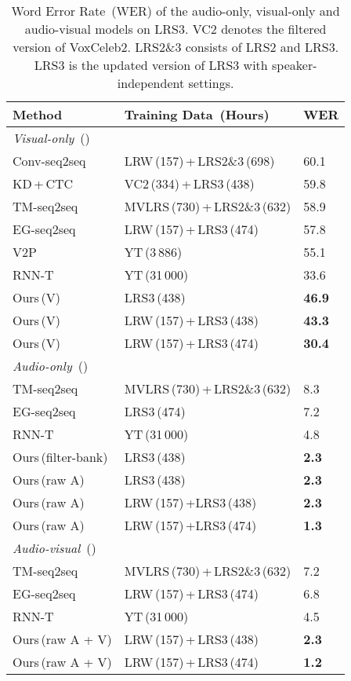 \begin{table}[!t]
\small
\renewcommand\arraystretch{0.9}
\begin{tabularx}{\columnwidth}{e v y}
\toprule
Method & Training Data \,(Hours) & WER \\
\midrule\midrule
\textit{Visual-only} \,() & &\\
\midrule
Conv-seq2seq  \cite{zhang2019spatio} &LRW\,(157)\,+\,LRS2\&3\,(698)  &60.1  \\\midrule
KD\,+\,CTC  \cite{afouras2020asr} &VC2\,(334)\,+\,LRS3\,(438)  &59.8\\\midrule
TM-seq2seq  \cite{afouras2018deep} &MVLRS\,(730)\,+\,LRS2\&3\,(632) &58.9  \\\midrule
EG-seq2seq  \cite{xu2020discriminative} &LRW\,(157)\,+\,LRS3\,(474)  &57.8 \\\midrule
V2P  \cite{shillingford2019large} &YT\,(3\,886)  &55.1 \\\midrule
RNN-T  \cite{makino2019recurrent} &YT\,(31\,000) &33.6 \\\midrule
Ours\,(V) &LRS3\,(438) &\textbf{46.9} \\\midrule
Ours\,(V) &LRW\,(157)\,+\,LRS3\,(438) &\textbf{43.3} \\\midrule
Ours\,(V)  &LRW\,(157)\,+\,LRS3\,(474)  &\textbf{30.4} \\
\midrule\midrule
\textit{Audio-only} \,() & &\\
\midrule
TM-seq2seq  \cite{afouras2018deep} &MVLRS\,(730)\,+\,LRS2\&3\,(632) &8.3  \\\midrule
EG-seq2seq  \cite{xu2020discriminative} &LRS3\,(474)  &7.2 \\\midrule
RNN-T  \cite{makino2019recurrent} &YT\,(31\,000)  &4.8 \\\midrule
Ours\,(filter-bank) &LRS3\,(438) &\textbf{2.3} \\\midrule
Ours\,(raw A) &LRS3\,(438) &\textbf{2.3} \\\midrule
Ours\,(raw A) &LRW\,(157)\,+LRS3\,(438) &\textbf{2.3} \\ \midrule
Ours\,(raw A) &LRW\,(157)\,+LRS3\,(474)  &\textbf{1.3} \\
\midrule\midrule
\textit{Audio-visual} \,() & &\\
\midrule
TM-seq2seq  \cite{afouras2018deep} &MVLRS\,(730)\,+\,LRS2\&3\,(632)  &7.2  \\\midrule
EG-seq2seq  \cite{xu2020discriminative} &LRW\,(157)\,+\,LRS3\,(474)  &6.8 \\\midrule
RNN-T  \cite{makino2019recurrent} &YT\,(31\,000)  &4.5 \\\midrule
Ours\,(raw A + V) &LRW\,(157)\,+\,LRS3\,(438)  &\textbf{2.3}\\\midrule
Ours\,(raw A + V) &LRW\,(157)\,+\,LRS3\,(474)  &\textbf{1.2}\\
\bottomrule
\end{tabularx}
\caption{Word Error Rate \,(WER) of the audio-only, visual-only and audio-visual models on LRS3. VC2 denotes the filtered version of VoxCeleb2. LRS2\&3 consists of LRS2 and LRS3. LRS3 is the updated version of LRS3 with speaker-independent settings.}
\label{table: results_on_LRS3}
\vspace{-4mm}
\end{table}